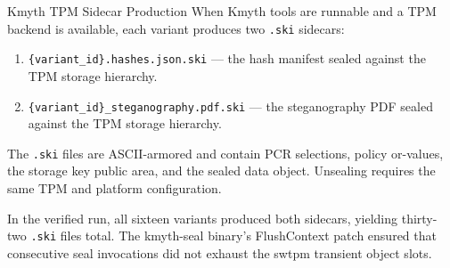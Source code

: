 \documentclass[
  ignorenonframetext,
]{beamer}
\providecommand{\tightlist}{%
  \setlength{\itemsep}{0pt}\setlength{\parskip}{0pt}}
\begin{document}
\begin{frame}{Kmyth TPM Sidecar Production}
\protect{}\label{kmyth-tpm-sidecar-production}
When Kmyth tools are runnable and a TPM backend is available, each
variant produces two \texttt{.ski} sidecars:

\begin{enumerate}
\tightlist
\item
  \texttt{\{variant\_id\}.hashes.json.ski} --- the hash manifest sealed
  against the TPM storage hierarchy.
\item
  \texttt{\{variant\_id\}\_steganography.pdf.ski} --- the steganography
  PDF sealed against the TPM storage hierarchy.
\end{enumerate}

The \texttt{.ski} files are ASCII-armored and contain PCR selections,
policy or-values, the storage key public area, and the sealed data
object. Unsealing requires the same TPM and platform configuration.

In the verified run, all sixteen variants produced both sidecars,
yielding thirty-two \texttt{.ski} files total. The kmyth-seal binary's
FlushContext patch ensured that consecutive seal invocations did not
exhaust the swtpm transient object slots.
\end{frame}
\end{document}
